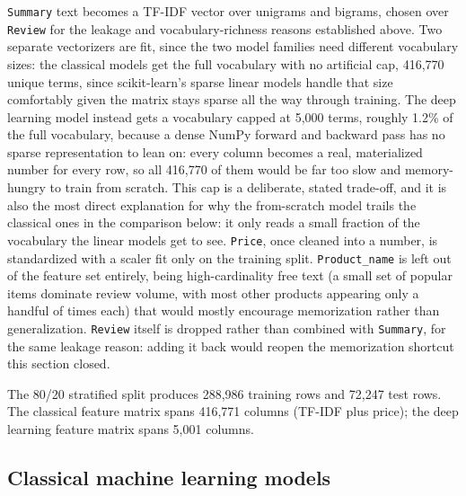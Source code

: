\documentclass[11pt]{article}
\begin{document}
\texttt{Summary} text becomes a TF-IDF vector over unigrams and bigrams, chosen over
\texttt{Review} for the leakage and vocabulary-richness reasons established above. Two
separate vectorizers are fit, since the two model families need different vocabulary
sizes: the classical models get the full vocabulary with no artificial cap, 416,770 unique
terms, since scikit-learn's sparse linear models handle that size comfortably given the
matrix stays sparse all the way through training. The deep learning model instead gets a
vocabulary capped at 5,000 terms, roughly 1.2\% of the full vocabulary, because a dense
NumPy forward and backward pass has no sparse representation to lean on: every column
becomes a real, materialized number for every row, so all 416,770 of them would be far too
slow and memory-hungry to train from scratch. This cap is a deliberate, stated trade-off,
and it is also the most direct explanation for why the from-scratch model trails the
classical ones in the comparison below: it only reads a small fraction of the vocabulary
the linear models get to see. \texttt{Price}, once cleaned into a number, is standardized
with a scaler fit only on the training split. \texttt{Product\_name} is left out of the
feature set entirely, being high-cardinality free text (a small set of popular items
dominate review volume, with most other products appearing only a handful of times each)
that would mostly encourage memorization rather than generalization. \texttt{Review}
itself is dropped rather than combined with \texttt{Summary}, for the same leakage reason:
adding it back would reopen the memorization shortcut this section closed.

The 80/20 stratified split produces 288,986 training rows and 72,247 test rows. The
classical feature matrix spans 416,771 columns (TF-IDF plus price); the deep learning
feature matrix spans 5,001 columns.

\subsection{Classical machine learning models}
\end{document}
